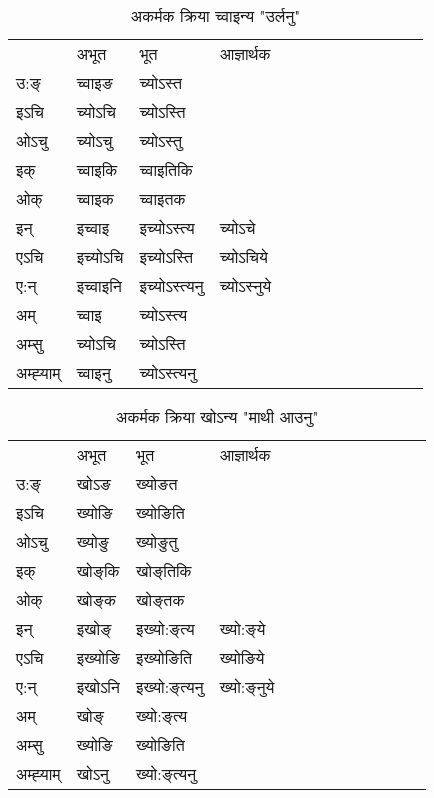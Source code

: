 \begin{table}[H]
\label{on.vi} \centering
\caption{अकर्मक क्रिया  च्‍वाइन्य  "उर्लनु"  }
\begin{tabular}{l|l|l|l|l|l|l|l|l|l|l|l|l}  \toprule
&अभूत & भूत & आज्ञार्थक \\ 
उ:ङ्‌ &च्‍वाइङ &च्योऽस्त \\ 
इऽचि &च्योऽचि &च्योऽस्ति   \\ 
ओऽचु &च्योऽचु &च्योऽस्तु   \\ 
इक् &च्‍वाइकि &च्‍वाइतिकि   \\ 
ओक् &च्‍वाइक &च्‍वाइतक   \\ 
इन् & इच्‍वाइ & इच्योऽस्त्य &च्योऽचे  \\ 
एऽचि & इच्योऽचि & इच्योऽस्ति &च्योऽचिये    \\ 
ए:न् & इच्‍वाइनि  & इच्योऽस्त्यनु &च्योऽस्‍नुये  \\ 
अम् & च्‍वाइ & च्योऽस्त्य   \\ 
अम्सु & च्योऽचि & च्योऽस्ति   \\ 
अम्ह्‍याम् & च्‍वाइनु  & च्योऽस्त्यनु \\ 
\bottomrule
\end{tabular}
\end{table}


\begin{table}[H]
\label{oŋ.vi} \centering
\caption{अकर्मक क्रिया  खोऽन्य  "माथी आउनु"  }
\begin{tabular}{l|l|l|l|l|l|l|l|l|l|l|l|l}  \toprule
&अभूत & भूत & आज्ञार्थक \\ 
उ:ङ्‌ &खोऽङ &ख्योङत \\ 
इऽचि &ख्योङि &ख्योङिति   \\ 
ओऽचु &ख्योङु &ख्योङुतु   \\ 
इक् &खोङ्‌कि &खोङ्‌तिकि   \\ 
ओक् &खोङ्‌क &खोङ्‌तक   \\ 
इन् & इखोङ्‌ & इख्यो:ङ्‌त्य &ख्यो:ङ्‌ये  \\ 
एऽचि & इख्योङि & इख्योङिति &ख्योङिये    \\ 
ए:न् & इखोऽनि  & इख्यो:ङ्‌त्यनु &ख्यो:ङ्‌नुये  \\ 
अम् & खोङ्‌ & ख्यो:ङ्‌त्य   \\ 
अम्सु & ख्योङि & ख्योङिति   \\ 
अम्ह्‍याम् & खोऽनु  & ख्यो:ङ्‌त्यनु \\ 
\bottomrule
\end{tabular}
\end{table}


